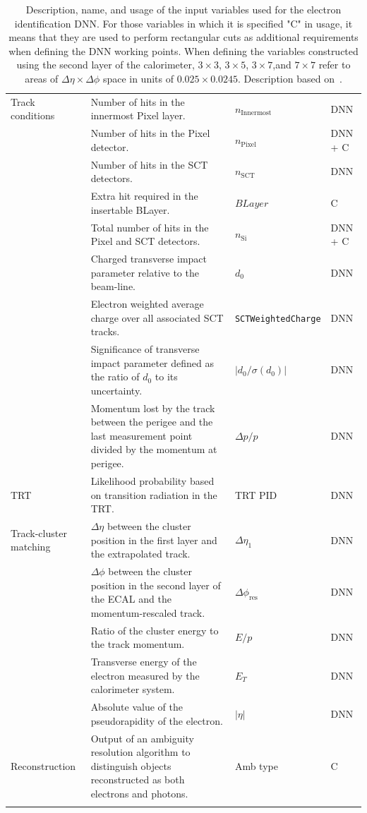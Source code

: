 {\begin{longtable}{p{2.3cm}p{6.5cm}p{1.8cm}p{1.8cm}}
  \midrule
  Track conditions & Number of hits in the innermost Pixel layer. & $n_{\text{Innermost}}$ & DNN \\
   & Number of hits in the Pixel detector. & $n_{\text{Pixel}}$ & DNN + C \\
   & Number of hits in the SCT detectors. & $n_{\text{SCT}}$ & DNN \\
   & Extra hit required in the insertable BLayer. & $BLayer$ & C \\
   & Total number of hits in the Pixel and SCT detectors. & $n_{\text{Si}}$ & DNN + C \\
   & Charged transverse impact parameter relative to the beam-line. & $d_0$ & DNN \\
   & Electron weighted average charge over all associated SCT tracks. & \tiny{\texttt{SCTWeightedCharge}} & DNN \\
   & Significance of transverse impact parameter defined as the ratio of $d_0$ to its uncertainty. & $|d_0/\sigma(d_0)|$ & DNN \\
   & Momentum lost by the track between the perigee and the last measurement point divided by the momentum at perigee. & $\Delta p/p$ & DNN \\
  \midrule
  TRT & Likelihood probability based on transition radiation in the TRT. & TRT PID & DNN \\
  \midrule
  Track-cluster matching & $\Delta\eta$ between the cluster position in the first layer and the extrapolated track. & $\Delta\eta_1$ & DNN \\
   & $\Delta\phi$ between the cluster position in the second layer of the ECAL and the momentum-rescaled track. & $\Delta\phi_{\text{res}}$ & DNN \\
   & Ratio of the cluster energy to the track momentum. & $E/p$ & DNN\\
   & Transverse energy of the electron measured by the calorimeter system. & $E_T$ & DNN \\
   & Absolute value of the pseudorapidity of the electron. & $|\eta|$ & DNN \\
  \midrule 
  Reconstruction & Output of an ambiguity resolution algorithm to distinguish objects reconstructed as both electrons and photons. & Amb type & C \\
  \bottomrule
  \caption{Description, name, and usage of the input variables used for the electron identification DNN. For those variables in which it is specified "C" in usage, it means that they are used to perform rectangular cuts as additional requirements when defining the DNN working points. When defining the variables constructed using the second layer of the calorimeter, $3\times3$, $3\times5$, $3\times7$,and $7\times7$ refer to areas of $\Delta \eta \times \Delta \phi$ space in units of $0.025\times0.0245$. Description based on~\cite{dnn_paper}. }
  \label{table:inputs}
\end{longtable}
}
